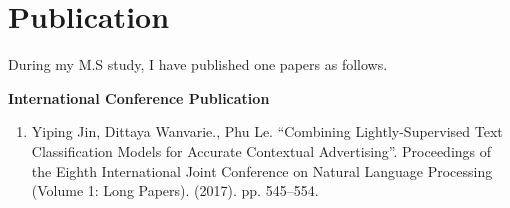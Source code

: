 \chapter{Publication} 
\label{app:math}

During my M.S study, I have published one papers as follows.

{\flushleft\bfseries International Conference Publication}
\begin{enumerate}
\item Yiping Jin, Dittaya Wanvarie., Phu Le. ``Combining Lightly-Supervised Text Classification Models for Accurate Contextual Advertising''. Proceedings of the Eighth International Joint Conference on Natural Language Processing (Volume 1: Long Papers). (2017). pp. 545--554.
\end{enumerate}
